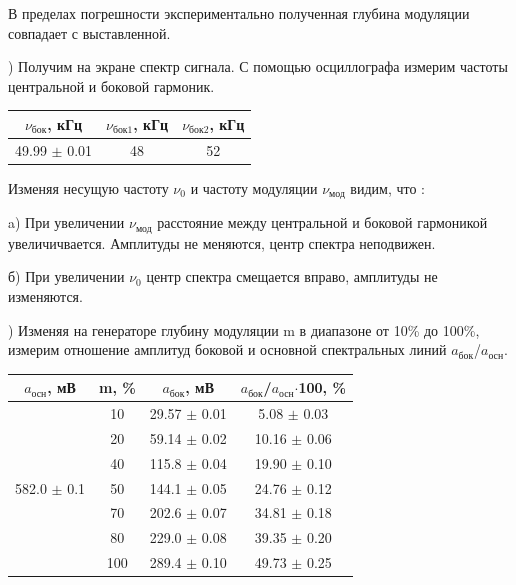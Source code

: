\documentclass[a4paper,12pt]{article}
\begin{document}
В пределах погрешности экспериментально полученная глубина модуляции совпадает с выставленной. 

) Получим на экране спектр сигнала. С помощью осциллографа измерим частоты центральной и боковой гармоник.

\begin{center}
\begin{tabular}{|c|c|c|}
	\hline
	$\nu_{\text{бок}}$, кГц & $\nu_{\text{бок1}}$, кГц & $\nu_{\text{бок2}}$, кГц \\
	\hline
	49.99 $\pm$ 0.01 & 48 & 52 \\
	\hline
\end{tabular}
\end{center}

Изменяя несущую частоту $\nu_0$ и частоту модуляции $\nu_{\text{мод}}$ видим, что :\\
\par a) При увеличении $\nu_{\text{мод}}$ расстояние между центральной и боковой гармоникой увеличичвается. Амплитуды не меняются, центр спектра неподвижен.
\par б) При увеличении $\nu_0$ центр спектра смещается вправо, амплитуды не изменяются. 

) Изменяя на генераторе глубину модуляции m в диапазоне от 10\% до 100\%, измерим отношение амплитуд боковой и основной спектральных линий $a_{\text{бок}}$/$a_{\text{осн}}$. 

\begin{center}
\begin{tabular}{|c|c|c|c|}
	\hline
	 $a_{\text{осн}}$, мВ & m, \% & $a_{\text{бок}}$, мВ & $a_{\text{бок}}$/$a_{\text{осн}}$$\cdot$100, \% \\
	\hline
	 \multirow{7}{*}{582.0 $\pm$ 0.1} & 10 & 29.57 $\pm$ 0.01 & 5.08 $\pm$ 0.03 \\
	\cline{2-4}  & 20  & 59.14 $\pm$ 0.02 & 10.16 $\pm$ 0.06 \\
	\cline{2-4}  & 40  & 115.8 $\pm$ 0.04 & 19.90 $\pm$ 0.10 \\
	\cline{2-4}  & 50  & 144.1 $\pm$ 0.05 & 24.76 $\pm$ 0.12 \\
	\cline{2-4}  & 70  & 202.6 $\pm$ 0.07 & 34.81 $\pm$ 0.18 \\
	\cline{2-4}  & 80  & 229.0 $\pm$ 0.08 & 39.35 $\pm$ 0.20 \\
	\cline{2-4}  & 100  & 289.4 $\pm$ 0.10 & 49.73 $\pm$ 0.25 \\
	\hline
\end{tabular}
\end{center}
\end{document}
